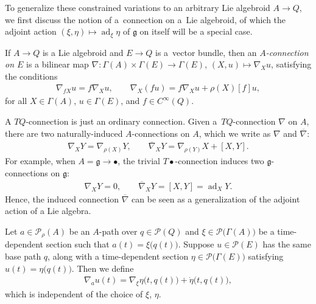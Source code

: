 \documentclass[pdftex]{sigma}
\numberwithin{equation}{section}
\begin{document}
To generalize these constrained variations to an arbitrary Lie algebroid $ A \rightarrow Q $, we f\/irst discuss the notion of a~connection on a~Lie algebroid, of which the adjoint action $ ( \xi, \eta ) \mapsto \operatorname{ad} _\xi \eta $ of $ \mathfrak{g} $ on itself will be a special case.

\begin{Definition} If $ A \rightarrow Q $ is a Lie algebroid and $ E \rightarrow Q $ is a~vector bundle, then an \emph{$A$-connection on $E$} is a bilinear map $ \nabla \colon \Gamma (A) \times \Gamma (E) \rightarrow \Gamma (E)$, $( X, u ) \mapsto \nabla _X u $, satisfying the conditions
 \begin{gather*}
 \nabla _{ f X } u = f \nabla _X u , \qquad \nabla _X ( f u ) = f \nabla _X u + \rho (X) [f] u ,
 \end{gather*}
 for all $ X \in \Gamma (A) $, $ u \in \Gamma (E) $, and $ f \in C ^\infty (Q) $.
\end{Definition}

\begin{Remark}
 A $ T Q $-connection is just an ordinary connection. Given a~$ T Q $-connection $ \nabla $ on $A$, there are two naturally-induced $A$-connections on $A$, which we write as $ \nabla $ and $ \overline{ \nabla } $:
 \begin{gather*}
 \nabla _X Y = \nabla _{\rho (X)} Y, \qquad \overline{ \nabla } _X Y = \nabla _{ \rho (Y) } X + \left[ X, Y
 \right] .
 \end{gather*}
 For example, when $ A = \mathfrak{g} \rightarrow \bullet $, the trivial $ T \bullet $-connection induces two $ \mathfrak{g} $-connections on $\mathfrak{g}$:
 \begin{gather*}
 \nabla _X Y = 0 , \qquad \overline{ \nabla } _X Y = [X, Y] = \operatorname{ad} _X Y .
 \end{gather*}
 Hence, the induced connection $ \overline{ \nabla } $ can be seen as a generalization of the adjoint action of a Lie algebra.
\end{Remark}

\begin{Definition} \label{def:pathConnection}
Let $ a \in \mathcal{P} _\rho (A) $ be an $A$-path over $ q \in \mathcal{P} (Q) $ and $ \xi \in \mathcal{P} \bigl( \Gamma (A) \bigr) $ be a time-dependent section such that $ a (t) = \xi \bigl( q (t) \bigr) $. Suppose $ u \in \mathcal{P} (E) $ has the same base path $q$, along
 with a time-dependent section $ \eta \in \mathcal{P} \bigl( \Gamma (E) \bigr) $ satisfying $ u (t) = \eta \bigl( q (t) \bigr) $. Then we def\/ine
 \begin{gather*}
 \nabla _a u (t) = \nabla _\xi \eta \bigl( t, q (t) \bigr) + \dot{\eta } \bigl( t, q (t) \bigr) ,
 \end{gather*}
which is independent of the choice of $ \xi$, $\eta $.
\end{Definition}
\end{document}
